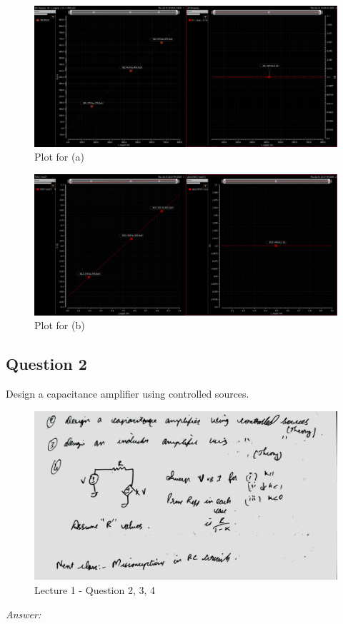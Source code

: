 \documentclass[a4paper]{article}
\begin{document}
\begin{figure}
    \centering
    \includegraphics[width=1\linewidth]{images/Lec_1_Q_1_a_plot.png}
    \caption{Plot for (a)}
\end{figure}

\begin{figure}
    \centering
    \includegraphics[width=1\linewidth]{images/Lec_1_Q_1_b_plot.png}
    \caption{Plot for (b)}
\end{figure}

\subsection{Question 2}
Design a capacitance amplifier using controlled sources.\\
\begin{figure}
    \centering
    \includegraphics[width=0.8\linewidth]{images/Lec_1_Q_2_3_4.jpeg}
    \caption{Lecture 1 - Question 2, 3, 4}
\end{figure}
\textit{Answer: }\\
\end{document}
